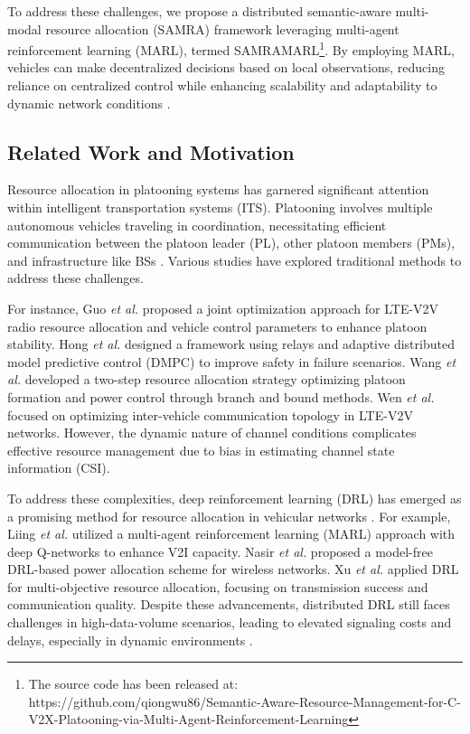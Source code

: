 \documentclass[10pt, lettersize,journal]{IEEEtran}
\begin{document}
	To address these challenges, we propose a distributed semantic-aware multi-modal resource allocation (SAMRA) framework leveraging multi-agent reinforcement learning (MARL), termed SAMRAMARL\footnote{The source code has been released at: https://github.com/qiongwu86/Semantic-Aware-Resource-Management-for-C-V2X-Platooning-via-Multi-Agent-Reinforcement-Learning}. By employing MARL, vehicles can make decentralized decisions based on local observations, reducing reliance on centralized control while enhancing scalability and adaptability to dynamic network conditions \cite{r13,n2}.
	
	\subsection{Related Work and Motivation}
	Resource allocation in platooning systems has garnered significant attention within intelligent transportation systems (ITS). Platooning involves multiple autonomous vehicles traveling in coordination, necessitating efficient communication between the platoon leader (PL), other platoon members (PMs), and infrastructure like BSs \cite{9878288}. Various studies have explored traditional methods to address these challenges.
	
	For instance, Guo \emph{et al.} \cite{RN1} proposed a joint optimization approach for LTE-V2V radio resource allocation and vehicle control parameters to enhance platoon stability. Hong \emph{et al.} \cite{RN2} designed a framework using relays and adaptive distributed model predictive control (DMPC) to improve safety in failure scenarios. Wang \emph{et al.} \cite{RN3} developed a two-step resource allocation strategy optimizing platoon formation and power control through branch and bound methods. Wen \emph{et al.} \cite{RN4} focused on optimizing inter-vehicle communication topology in LTE-V2V networks. However, the dynamic nature of channel conditions complicates effective resource management due to bias in estimating channel state information (CSI).
	
	To address these complexities, deep reinforcement learning (DRL) has emerged as a promising method for resource allocation in vehicular networks \cite{RN5, RN6, RN7, RN8}. For example, Liing \emph{et al.} \cite{RN5} utilized a multi-agent reinforcement learning (MARL) approach with deep Q-networks to enhance V2I capacity. Nasir \emph{et al.} \cite{RN6} proposed a model-free DRL-based power allocation scheme for wireless networks. Xu \emph{et al.} \cite{RN7} applied DRL for multi-objective resource allocation, focusing on transmission success and communication quality. Despite these advancements, distributed DRL still faces challenges in high-data-volume scenarios, leading to elevated signaling costs and delays, especially in dynamic environments \cite{10416925}.
	
\end{document}

